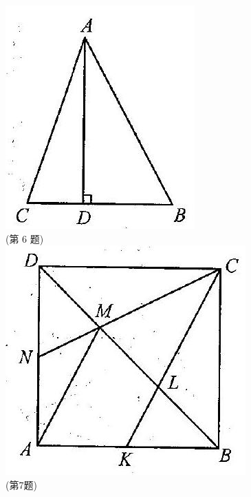 \documentclass[10pt]{article}
\begin{document}
\includegraphics[max width=\textwidth, center]{2024_10_30_2c8f45efd4a519b08e1ag-135(2)}\\
(第 6 题)\\
\includegraphics[max width=\textwidth, center]{2024_10_30_2c8f45efd4a519b08e1ag-135(3)}\\
(第7题)
\end{document}
